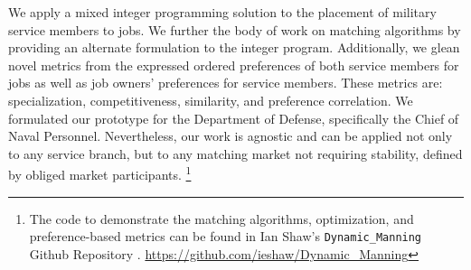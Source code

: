 We apply a mixed integer programming solution to the placement of military service members to jobs. We further the body of work on matching algorithms by providing an alternate formulation to the integer program.  Additionally, we glean novel metrics from the expressed ordered preferences of both service members for jobs as well as job owners’ preferences for service members. These metrics are: specialization, competitiveness, similarity, and preference correlation. We formulated our prototype for the Department of Defense, specifically the Chief of Naval Personnel. Nevertheless, our work is agnostic and can be applied not only to any service branch, but to any matching market not requiring stability, defined by obliged market participants.  \footnote{The code to demonstrate the matching algorithms, optimization, and preference-based metrics can be found in Ian Shaw's \texttt{Dynamic\_Manning} Github Repository . \url{https://github.com/ieshaw/Dynamic_Manning}}

